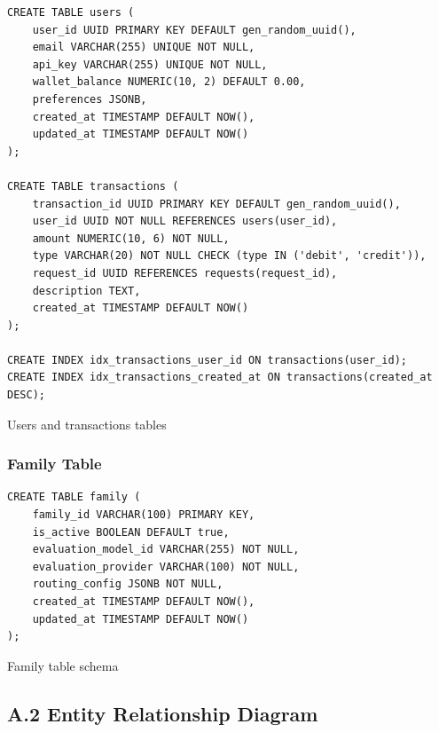 \documentclass[english]{article}
\begin{document}
\begin{listing}[H]
\begin{verbatim}
CREATE TABLE users (
    user_id UUID PRIMARY KEY DEFAULT gen_random_uuid(),
    email VARCHAR(255) UNIQUE NOT NULL,
    api_key VARCHAR(255) UNIQUE NOT NULL,
    wallet_balance NUMERIC(10, 2) DEFAULT 0.00,
    preferences JSONB,
    created_at TIMESTAMP DEFAULT NOW(),
    updated_at TIMESTAMP DEFAULT NOW()
);

CREATE TABLE transactions (
    transaction_id UUID PRIMARY KEY DEFAULT gen_random_uuid(),
    user_id UUID NOT NULL REFERENCES users(user_id),
    amount NUMERIC(10, 6) NOT NULL,
    type VARCHAR(20) NOT NULL CHECK (type IN ('debit', 'credit')),
    request_id UUID REFERENCES requests(request_id),
    description TEXT,
    created_at TIMESTAMP DEFAULT NOW()
);

CREATE INDEX idx_transactions_user_id ON transactions(user_id);
CREATE INDEX idx_transactions_created_at ON transactions(created_at DESC);
\end{verbatim}
\caption{Users and transactions tables}
\end{listing}

\subsubsection*{Family Table}

\begin{listing}[H]
\begin{verbatim}
CREATE TABLE family (
    family_id VARCHAR(100) PRIMARY KEY,
    is_active BOOLEAN DEFAULT true,
    evaluation_model_id VARCHAR(255) NOT NULL,
    evaluation_provider VARCHAR(100) NOT NULL,
    routing_config JSONB NOT NULL,
    created_at TIMESTAMP DEFAULT NOW(),
    updated_at TIMESTAMP DEFAULT NOW()
);
\end{verbatim}
\caption{Family table schema}
\end{listing}

\subsection*{A.2 Entity Relationship Diagram}
\end{document}
